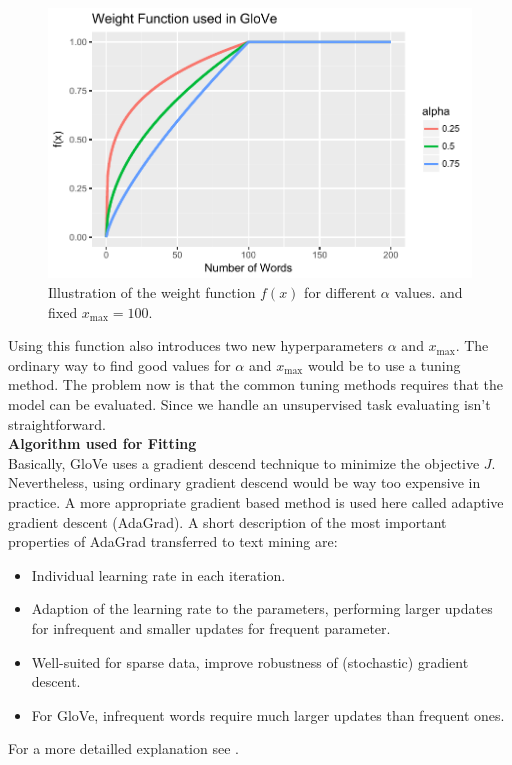 \begin{figure}[!h]
\centering
\includegraphics[scale=0.8]{images/weight_fun.pdf} 
\caption[Weight function used in GloVe.]{Illustration of the weight function $f(x)$ for different $\alpha$ values.
        and fixed $x_\mathrm{max} = 100$.}
\label{fig:wf}
\end{figure}

Using this function also introduces two new hyperparameters $\alpha$ and 
$x_\mathrm{max}$. The ordinary way to find good values for $\alpha$ and 
$x_\mathrm{max}$ would be to use a tuning method. The problem now is that the common tuning methods requires that the model can be evaluated. Since we handle an
unsupervised task evaluating isn't straightforward. \\

\textbf{Algorithm used for Fitting} \\

Basically, GloVe uses a gradient descend technique to minimize the objective 
$J$. Nevertheless, using ordinary gradient descend would be way too expensive
in practice. A more appropriate gradient based method is used here called adaptive 
gradient descent (AdaGrad). A short description of the most important properties of 
AdaGrad transferred to text mining are:

\begin{itemize}
  \item
    Individual learning rate in each iteration.

  \item 
    Adaption of the learning rate to the parameters, performing larger updates 
    for infrequent and smaller updates for frequent parameter.

  \item 
    Well-suited for sparse data, improve robustness of (stochastic) gradient 
    descent.
  
  \item 
    For GloVe, infrequent words require much larger updates than frequent ones.
\end{itemize}

For a more detailled explanation see \cite{ruder2016overview}.